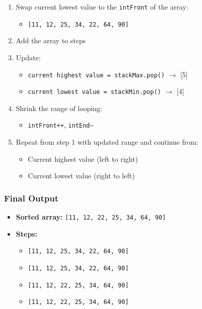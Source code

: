 \documentclass{article}
\begin{document}
\begin{enumerate}
    \item Swap current lowest value to the \texttt{intFront} of the array:
    \begin{itemize}
        \item \texttt{[11, 12, 25, 34, 22, 64, 90]}
    \end{itemize}

    \item Add the array to steps

    \item Update:
    \begin{itemize}
        \item \texttt{current highest value = stackMax.pop()} \(\rightarrow\) [5]
        \item \texttt{current lowest value = stackMin.pop()} \(\rightarrow\) [4]
    \end{itemize}

    \item Shrink the range of looping:
    \begin{itemize}
        \item \texttt{intFront++}, \quad \texttt{intEnd--}
    \end{itemize}

    \item Repeat from step 1 with updated range and continue from:
    \begin{itemize}
        \item Current highest value (left to right)
        \item Current lowest value (right to left)
    \end{itemize}
\end{enumerate}

\subsubsection*{Final Output}
\begin{itemize}
    \item \textbf{Sorted array:} \texttt{[11, 12, 22, 25, 34, 64, 90]}
    \item \textbf{Steps:}
    \begin{itemize}
        \item \texttt{[11, 12, 25, 34, 22, 64, 90]}
        \item \texttt{[11, 12, 25, 34, 22, 64, 90]}
        \item \texttt{[11, 12, 22, 25, 34, 64, 90]}
        \item \texttt{[11, 12, 22, 25, 34, 64, 90]}
    \end{itemize}
\end{itemize}
\end{document}
